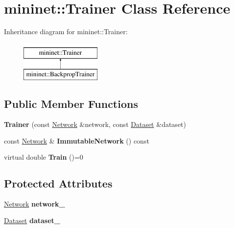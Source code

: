 \hypertarget{classmininet_1_1_trainer}{}\section{mininet\+:\+:Trainer Class Reference}
\label{classmininet_1_1_trainer}
Inheritance diagram for mininet\+:\+:Trainer\+:\begin{figure}[H]
\begin{center}
\leavevmode
\includegraphics[height=2.000000cm]{classmininet_1_1_trainer}
\end{center}
\end{figure}
\subsection*{Public Member Functions}
\begin{DoxyCompactItemize}
\item 
\hypertarget{classmininet_1_1_trainer_a10eb9b167eec0d9d62ed4441b8addf76}{}\label{classmininet_1_1_trainer_a10eb9b167eec0d9d62ed4441b8addf76} 
{\bfseries Trainer} (const \hyperlink{classmininet_1_1_network}{Network} \&network, const \hyperlink{classmininet_1_1_dataset}{Dataset} \&dataset)
\item 
\hypertarget{classmininet_1_1_trainer_a557fde17a1312e23d3d7d7012c9e2439}{}\label{classmininet_1_1_trainer_a557fde17a1312e23d3d7d7012c9e2439} 
const \hyperlink{classmininet_1_1_network}{Network} \& {\bfseries Immutable\+Network} () const
\item 
\hypertarget{classmininet_1_1_trainer_a2bfdcdf98d5031fe3da6a9a2a48dd986}{}\label{classmininet_1_1_trainer_a2bfdcdf98d5031fe3da6a9a2a48dd986} 
virtual double {\bfseries Train} ()=0
\end{DoxyCompactItemize}
\subsection*{Protected Attributes}
\begin{DoxyCompactItemize}
\item 
\hypertarget{classmininet_1_1_trainer_a7fe0129fba9e72f11ae32e33abc4df12}{}\label{classmininet_1_1_trainer_a7fe0129fba9e72f11ae32e33abc4df12} 
\hyperlink{classmininet_1_1_network}{Network} {\bfseries network\+\_\+}
\item 
\hypertarget{classmininet_1_1_trainer_a18121bfd6966a1b9db98f484b7bf0f2f}{}\label{classmininet_1_1_trainer_a18121bfd6966a1b9db98f484b7bf0f2f} 
\hyperlink{classmininet_1_1_dataset}{Dataset} {\bfseries dataset\+\_\+}
\end{DoxyCompactItemize}


